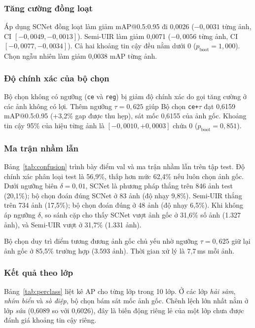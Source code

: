 \documentclass[runningheads]{llncs}
\begin{document}
\subsubsection{Tăng cường đồng loạt}
Áp dụng SCNet đồng loạt làm giảm mAP@0.5:0.95 đi 0,0026 ($-0{,}0031$ từng ảnh, CI $[-0{,}0049, -0{,}0013]$). Semi-UIR làm giảm 0,0071 ($-0{,}0056$ từng ảnh, CI $[-0{,}0077, -0{,}0034]$). Cả hai khoảng tin cậy đều nằm dưới 0 ($p_{\text{boot}} = 1{,}000$). Chọn ngẫu nhiên làm giảm 0,0038 mAP từng ảnh.

\subsubsection{Độ chính xác của bộ chọn}
Bộ chọn không có ngưỡng (\texttt{ce} và \texttt{reg}) bị giảm độ chính xác do gọi tăng cường ở các ảnh không có lợi. Thêm ngưỡng $\tau = 0{,}625$ giúp Bộ chọn \texttt{ce+$\tau$} đạt 0,6159 mAP@0.5:0.95 (+3,2\% gap được thu hẹp), sát mốc 0,6155 của ảnh gốc. Khoảng tin cậy 95\% của hiệu từng ảnh là $[-0{,}0010, +0{,}0003]$ chứa 0 ($p_{\text{boot}} = 0{,}851$).

\subsubsection{Ma trận nhầm lẫn}
Bảng~\ref{tab:confusion} trình bày điểm val và ma trận nhầm lẫn trên tập test. Độ chính xác phân loại test là 56,9\%, thấp hơn mức 62,4\% nếu luôn chọn ảnh gốc. Dưới ngưỡng biên $\delta = 0{,}01$, SCNet là phương pháp thắng trên 846 ảnh test (20,1\%); bộ chọn đoán đúng SCNet ở 83 ảnh (độ nhạy 9,8\%). Semi-UIR thắng trên 734 ảnh (17,5\%); bộ chọn đoán đúng ở 48 ảnh (độ nhạy 6,5\%). Khi không áp ngưỡng $\delta$, so sánh cặp cho thấy SCNet vượt ảnh gốc ở 31,6\% số ảnh (1.327 ảnh), và Semi-UIR vượt ở 31,7\% (1.331 ảnh).

Bộ chọn duy trì điểm tương đương ảnh gốc chủ yếu nhờ ngưỡng $\tau = 0{,}625$ giữ lại ảnh gốc ở 85,5\% trường hợp (3.593 ảnh). Thời gian xử lý là 7,7\,ms mỗi ảnh.

\subsubsection{Kết quả theo lớp}
Bảng~\ref{tab:perclass} liệt kê AP cho từng lớp trong 10 lớp. Ở các lớp \emph{hải sâm}, \emph{nhím biển} và \emph{sò điệp}, bộ chọn bám sát mốc ảnh gốc. Chênh lệch lớn nhất nằm ở lớp \emph{sứa} (0,6089 so với 0,6026), đây là biến động riêng lẻ của một lớp chưa được đánh giá khoảng tin cậy riêng.
\end{document}

